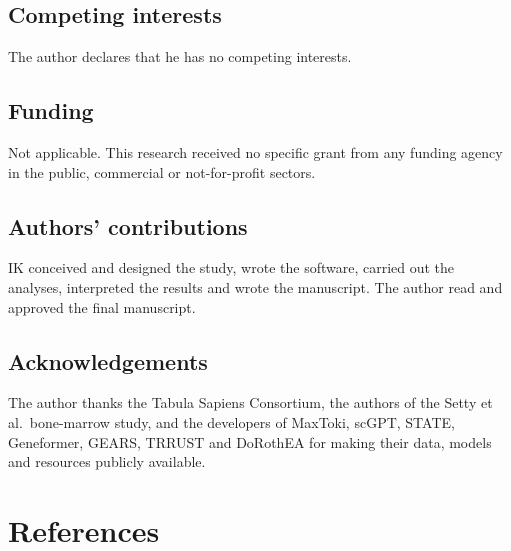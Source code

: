 \documentclass[
  11pt,
]{article}
\begin{document}
\subsection{Competing interests}\label{competing-interests}

The author declares that he has no competing interests.

\subsection{Funding}\label{funding}

Not applicable. This research received no specific grant from any
funding agency in the public, commercial or not-for-profit sectors.

\subsection{Authors' contributions}\label{authors-contributions}

IK conceived and designed the study, wrote the software, carried out the
analyses, interpreted the results and wrote the manuscript. The author
read and approved the final manuscript.

\subsection{Acknowledgements}\label{acknowledgements}

The author thanks the Tabula Sapiens Consortium, the authors of the
Setty et al.~bone-marrow study, and the developers of MaxToki, scGPT,
STATE, Geneformer, GEARS, TRRUST and DoRothEA for making their data,
models and resources publicly available.

\section{References}\label{references}
\end{document}
